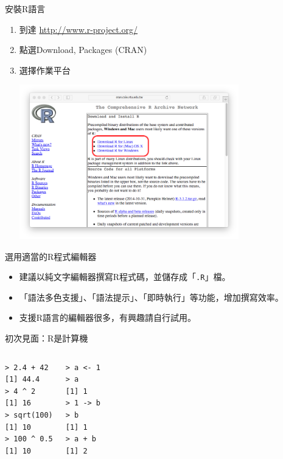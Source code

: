 \documentclass[12pt, aspectratio=43]{beamer}
\let\oldfootnote\footnote
\renewcommand\footnote[1]{\hspace{-0.3em}\oldfootnote{\ignorespaces#1}\hspace{0.3em}}
\begin{document}
\begin{frame}[fragile]{安裝R語言}
\begin{enumerate}
\item 到達 \url{http://www.r-project.org/}
\item 點選Download, Packages (CRAN) \\
\item 選擇作業平台
	\begin{center}\includegraphics[width=0.75\textwidth]{downloadR.png}\end{center}
\end{enumerate}
\end{frame}

\begin{frame}[fragile]{選用適當的R程式編輯器}
\begin{itemize}
\item 建議以純文字編輯器撰寫R程式碼，並儲存成「\verb+.R+」檔。
\item 「語法多色支援」、「語法提示」、「即時執行」等功能，增加撰寫效率。
\item 支援R語言的編輯器很多，有興趣請自行試用。
\end{itemize}
\end{frame}


\begin{frame}[fragile]{初次見面：R是計算機}
\begin{columns}
\begin{verbatim}
> 2.4 + 42
[1] 44.4
> 4 ^ 2
[1] 16
> sqrt(100)
[1] 10
> 100 ^ 0.5
[1] 10
\end{verbatim}

\begin{verbatim}
> a <- 1
> a
[1] 1
> 1 -> b
> b
[1] 1
> a + b
[1] 2
\end{verbatim}

\end{columns}
\end{frame}
\end{document}
